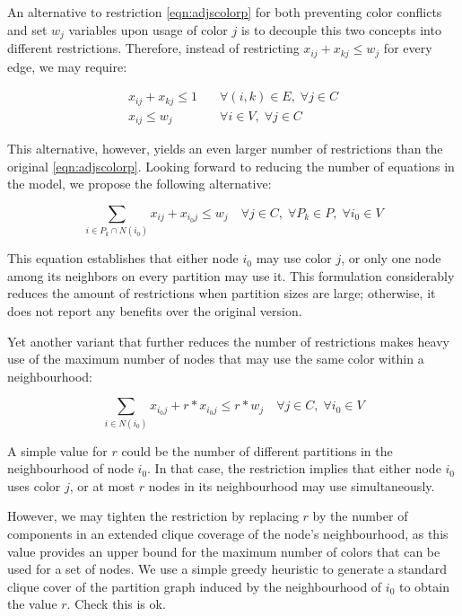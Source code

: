 An alternative to restriction \ref{eqn:adjscolorp} for both preventing color conflicts and set $w_j$ variables upon usage of color $j$ is to decouple this two concepts into different restrictions. Therefore, instead of restricting $x_{ij} + x_{kj} \leq w_j$ for every edge, we may require:

\begin{align}
x_{ij} + x_{kj} \leq 1 \quad &\forall (i,k) \in E, \; \forall j \in C \label{eqn:adjscolorpone}\\
x_{ij} \leq w_{j} \quad &\forall i \in V, \; \forall j \in C \label{eqn:nodelessthanwj}
\end{align}

This alternative, however, yields an even larger number of restrictions than the original \ref{eqn:adjscolorp}. Looking forward to reducing the number of equations in the model, we propose the following alternative:

\begin{equation}
\label{eqn:adjsperpart}
\sum_{i \in P_k \cap N(i_0)} x_{ij} + x_{i_0j} \leq w_j \quad \forall j \in C, \; \forall P_k \in P, \; \forall i_0 \in V 
\end{equation}

This equation establishes that either node $i_0$ may use color $j$, or only one node among its neighbors on every partition may use it. This formulation considerably reduces the amount of restrictions when partition sizes are large; otherwise, it does not report any benefits over the original version.

Yet another variant that further reduces the number of restrictions makes heavy use of the maximum number of nodes that may use the same color within a neighbourhood:

\begin{equation}
\label{eqn:adjsneighb}
\sum_{i \in N(i_0)} x_{i_0j} + r * x_{i_0j} \leq r * w_j \quad \forall j \in C, \; \forall i_0 \in V 
\end{equation}

A simple value for $r$ could be the number of different partitions in the neighbourhood of node $i_0$. In that case, the restriction implies that either node $i_0$ uses color $j$, or at most $r$ nodes in its neighbourhood may use simultaneously.

However, we may tighten the restriction by replacing $r$ by the number of components in an extended clique coverage of the node's neighbourhood, as this value provides an upper bound for the maximum number of colors that can be used for a set of nodes. We use a simple greedy heuristic to generate a standard clique cover of the partition graph induced by the neighbourhood of $i_0$ to obtain the value $r$. \TODO Check this is ok.

